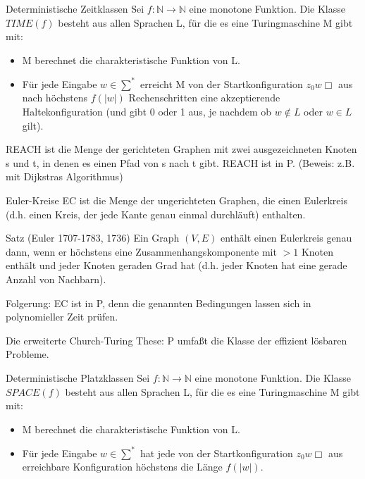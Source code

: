 \documentclass[avery5371]{flashcards}
\begin{document}
\begin{flashcard}[Definition]{Deterministische Zeitklassen} 
Sei $f:\mathbb{N}\rightarrow\mathbb{N}$ eine monotone Funktion. Die Klasse $TIME(f)$ besteht aus allen Sprachen L, für die es eine Turingmaschine M gibt mit:
\begin{itemize}
\item M berechnet die charakteristische Funktion von L.
\item Für jede Eingabe $w\in\sum^*$ erreicht M von der Startkonfiguration $z_0 w\Box$ aus nach höchstens $f(|w|)$ Rechenschritten eine akzeptierende Haltekonfiguration (und gibt 0 oder 1 aus, je nachdem ob $w\not\in L$ oder $w\in L$ gilt).
\end{itemize}
\end{flashcard}

\begin{flashcard}[Definition]{ REACH} ist die Menge der gerichteten Graphen mit zwei ausgezeichneten Knoten s und t, in denen es einen Pfad von s nach t gibt.
 REACH ist in P. (Beweis: z.B. mit Dijkstras Algorithmus)
\end{flashcard}

 \begin{flashcard}[Definition]{Euler-Kreise}  EC ist die Menge der ungerichteten Graphen, die einen Eulerkreis (d.h. einen Kreis, der jede Kante genau einmal durchläuft) enthalten.
 \end{flashcard}

\begin{flashcard}[Satz]{ Satz  (Euler 1707-1783, 1736)} Ein Graph $(V,E)$ enthält einen Eulerkreis genau dann, wenn er höchstens eine Zusammenhangskomponente mit $>1$ Knoten enthält und jeder Knoten geraden Grad hat (d.h. jeder Knoten hat eine gerade Anzahl von Nachbarn).

Folgerung: EC ist in P, denn die genannten Bedingungen lassen sich in polynomieller Zeit prüfen.

Die erweiterte Church-Turing These: P umfaßt die Klasse der effizient lösbaren Probleme.
\end{flashcard}

\begin{flashcard}[Definition]{Deterministische Platzklassen}
 Sei $f:\mathbb{N}\rightarrow\mathbb{N}$ eine monotone Funktion. Die Klasse $SPACE(f )$ besteht aus allen Sprachen L, für die es eine Turingmaschine M gibt mit:\begin{itemize}
\item M berechnet die charakteristische Funktion von L.
\item Für jede Eingabe $w\in\sum^*$ hat jede von der Startkonfiguration $z_0 w\Box$ aus erreichbare Konfiguration höchstens die Länge $f(|w|)$.
\end{itemize}
\end{flashcard}
\end{document}
